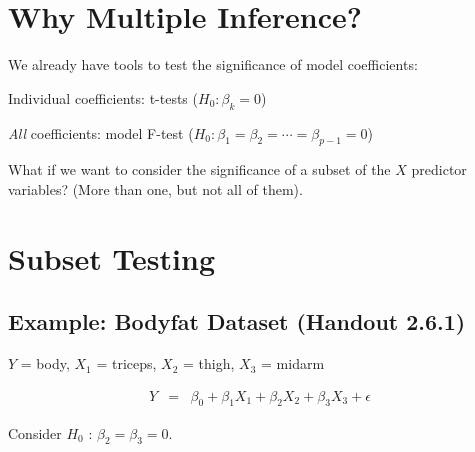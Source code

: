 \documentclass[12pt]{../notes}
\begin{document}

\section{Why Multiple Inference?}

We already have tools to test the significance of model coefficients:
\bi
\item Individual coefficients: t-tests ($H_0: \beta_k = 0$)
\item \textit{All} coefficients: model F-test ($H_0: \beta_1 = \beta_2 = \cdots = \beta_{p-1} = 0$)
\ei

\nspace
What if we want to consider the significance of a subset of the $X$ predictor variables? (More than one, but not all of them). 


\section{Subset Testing} 

\subsection*{Example: Bodyfat Dataset (Handout 2.6.1)}
$Y$ = body, $X_1$ = triceps, $X_2$ = thigh, $X_3$ = midarm

\vspace{-1em}

\begin{eqnarray}
  Y & = & \beta_0 + \beta_1 X_1 + \beta_2 X_2 + \beta_3 X_3 + \epsilon \nonumber
\end{eqnarray}

Consider $H_0$ : $\beta_2=\beta_3=0$.
\end{document}
